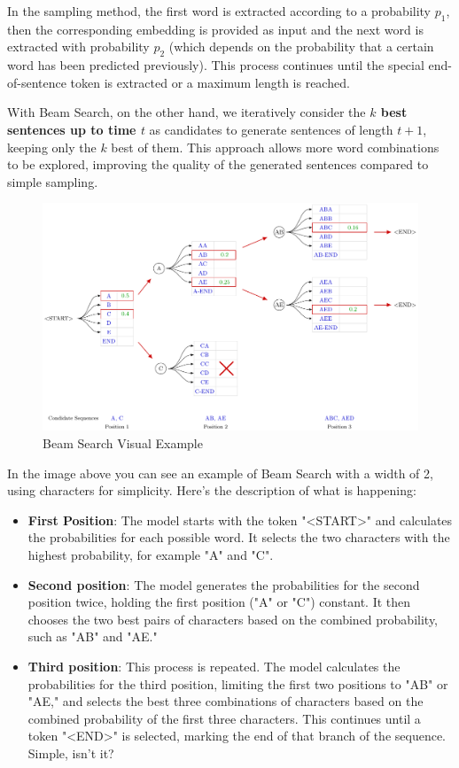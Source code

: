In the sampling method, the first word is extracted according to a probability $p_1$, then the corresponding embedding is provided as input and the next word is extracted with probability $p_2$ (which depends on the probability that a certain word has been predicted previously). This process continues until the special end-of-sentence token is extracted or a maximum length is reached.

With Beam Search, on the other hand, we iteratively consider the \textbf{$k$ best sentences up to time $t$} as candidates to generate sentences of length $t+1$, keeping only the $k$ best of them. This approach allows more word combinations to be explored, improving the quality of the generated sentences compared to simple sampling.

\begin{figure}[!htbp]
    \centering
    \includegraphics[width=\linewidth]{tikz/chapter7 - Beam Search.pdf}
    \caption{Beam Search Visual Example}
\end{figure}

In the image above you can see an example of Beam Search with a width of 2, using characters for simplicity. Here's the description of what is happening:
\begin{itemize}
    \item \textbf{First Position}: The model starts with the token "<START>" and calculates the probabilities for each possible word. It selects the two characters with the highest probability, for example "A" and "C". 
    \item \textbf{Second position}: The model generates the probabilities for the second position twice, holding the first position ("A" or "C") constant. It then chooses the two best pairs of characters based on the combined probability, such as "AB" and "AE."
    \item \textbf{Third position}: This process is repeated. The model calculates the probabilities for the third position, limiting the first two positions to "AB" or "AE," and selects the best three combinations of characters based on the combined probability of the first three characters. This continues until a token "<END>" is selected, marking the end of that branch of the sequence. Simple, isn't it? 
\end{itemize}

